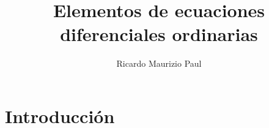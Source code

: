 \documentclass[a4paper, twoside, 11pt]{report}
\title{Elementos de ecuaciones diferenciales ordinarias}
\author{Ricardo Maurizio Paul}
\begin{document}
\maketitle

\chapter{Introducción}

\end{document}
